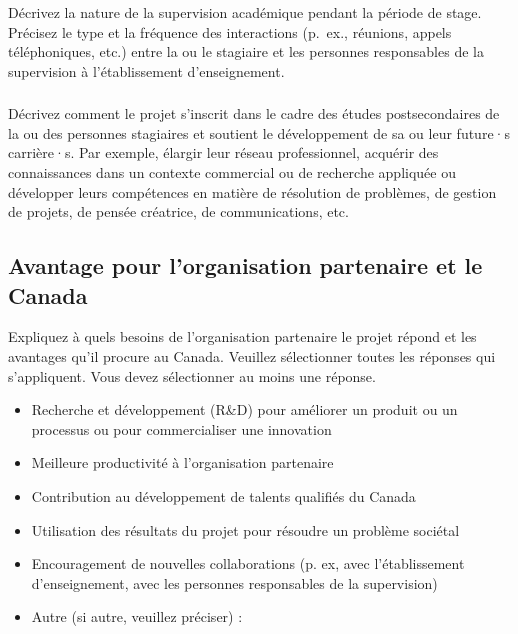 \documentclass{mitacs-acceleration}
\begin{document}
\subsubsection{}\begin{instructions}
Décrivez la nature de la supervision académique pendant la période de stage. Précisez le type et la fréquence des interactions (p.\ ex., réunions, appels téléphoniques, etc.) entre la ou le stagiaire et les personnes responsables de la supervision à l'établissement d'enseignement.
\end{instructions}

\subsubsection{}\begin{instructions}
Décrivez comment le projet s'inscrit dans le cadre des études postsecondaires de la ou des personnes stagiaires et soutient le développement de sa ou leur future·s carrière·s. Par exemple, élargir leur réseau professionnel, acquérir des connaissances dans un contexte commercial ou de recherche appliquée ou développer leurs compétences en matière de résolution de problèmes, de gestion de projets, de pensée créatrice, de communications, etc.
\end{instructions}


\subsection{Avantage pour l'organisation partenaire et le Canada} %

\begin{instructions}
Expliquez à quels besoins de l'organisation partenaire le projet répond et les avantages qu'il procure au Canada. Veuillez sélectionner toutes les réponses qui s'appliquent. Vous devez sélectionner au moins une réponse.
\end{instructions}

\begin{itemize}[label=$\boxempty$]
\item Recherche et développement (R\&D) pour améliorer un produit ou un processus ou pour commercialiser une innovation 
\item Meilleure productivité à l'organisation partenaire 
\item Contribution au développement de talents qualifiés du Canada
\item Utilisation des résultats du projet pour résoudre un problème sociétal  
\item Encouragement de nouvelles collaborations (p. ex, avec l'établissement d'enseignement, avec les personnes responsables de la supervision)  
\item Autre (si autre, veuillez préciser) :
\end{itemize}
\end{document}
